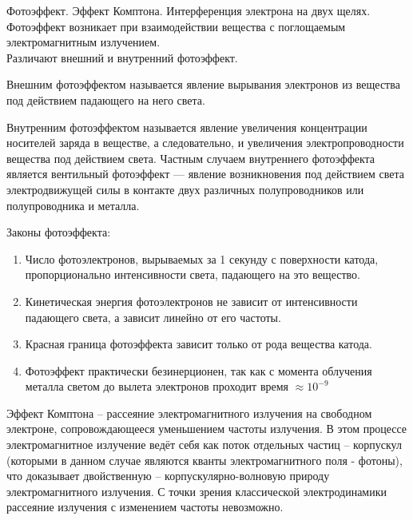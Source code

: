 \documentclass[__main__.tex]{subfiles}
\begin{document}
Фотоэффект. Эффект Комптона. Интерференция электрона на двух щелях.\\


Фотоэффект возникает при взаимодействии вещества с поглощаемым электромагнитным излучением.\\

Различают внешний и внутренний фотоэффект.

\begin{definition}
    Внешним фотоэффектом называется явление вырывания электронов из вещества под действием падающего на него света.
\end{definition}

\begin{definition}
    Внутренним фотоэффектом называется явление увеличения концентрации носителей заряда в веществе, а следовательно, и увеличения электропроводности вещества под действием света. Частным случаем внутреннего фотоэффекта является вентильный фотоэффект — явление возникновения под действием света электродвижущей силы в контакте двух различных полупроводников или полупроводника и металла.
\end{definition}

Законы фотоэффекта:

\begin{enumerate}
    \item Число фотоэлектронов, вырываемых за 1 секунду с поверхности катода, пропорционально интенсивности света, падающего на это вещество.
    \item Кинетическая энергия фотоэлектронов не зависит от интенсивности падающего света, а зависит линейно от его частоты.
    \item Красная граница фотоэффекта зависит только от рода вещества катода.
    \item Фотоэффект практически безинерционен, так как с момента облучения металла светом до вылета электронов проходит время $\approx 10^{-9}$
\end{enumerate}

\begin{definition}
    Эффект Комптона – рассеяние электромагнитного излучения на свободном электроне, сопровождающееся уменьшением частоты излучения. В этом процессе электромагнитное излучение ведёт себя как поток отдельных частиц – корпускул (которыми в данном случае являются кванты электромагнитного поля - фотоны), что доказывает двойственную – корпускулярно-волновую природу электромагнитного излучения. С точки зрения классической электродинамики рассеяние излучения с изменением частоты невозможно.
\end{definition}
\end{document}
